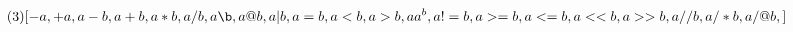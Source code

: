 \documentclass[preview]{standalone}
\begin{document}
\begin{equation}
\tag{3}
    [
  -a,
  +a,
  a-b,
  a+b,
  a*b,
  a/b,
  a\b,
  a@b,
  a|b,
  a=b,
  a<b,
  a>b,
  a%
  a^b,
  a!=b,
  a>=b,
  a<=b,
  a<<b,
  a>>b,
  a//b,
  a/*b,
  a/@b,
  ]
\end{equation}
\end{document}
